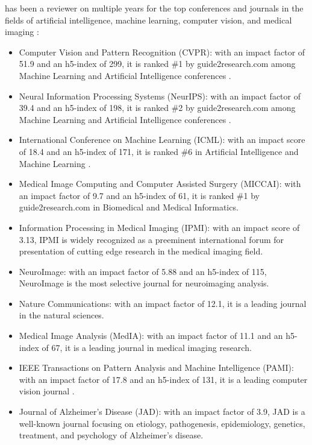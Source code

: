 \documentclass[11pt]{article}
\begin{document}
\dr has been a reviewer on multiple years for the top conferences and journals in the fields of artificial intelligence, machine learning, computer vision, and medical imaging \cite{reviews}:
\begin{itemize}
    \item Computer Vision and Pattern Recognition (CVPR): with an impact factor of 51.9 and an h5-index of 299, it is ranked \#1 by guide2research.com among Machine Learning and Artificial Intelligence conferences  \cite{confrankings}.
    \item Neural Information Processing Systems (NeurIPS): with an impact factor of 39.4 and an h5-index of 198, it is ranked \#2 by guide2research.com among Machine Learning and Artificial Intelligence conferences \cite{confrankings}.
    \item International Conference on Machine Learning (ICML): with an impact score of 18.4 and an h5-index of 171, it is ranked \#6 in Artificial Intelligence and Machine Learning \cite{confrankings}. 
    \item Medical Image Computing and Computer Assisted Surgery (MICCAI): with an impact factor of 9.7 and an h5-index of 61, it is ranked \#1 by guide2research.com in Biomedical and Medical Informatics.
    \item Information Processing in Medical Imaging (IPMI): with an impact score of 3.13, IPMI is widely recognized as a preeminent international forum for presentation of cutting edge research in the medical imaging field. \cite{confrankings}
    \item NeuroImage: with an impact factor of 5.88 and an h5-index of 115, NeuroImage is the most selective journal for neuroimaging analysis. \cite{confrankings}
    \item Nature Communications: with an impact factor of 12.1, it is a leading journal in the natural sciences. \cite{confrankings}
    \item Medical Image Analysis (MedIA): with an impact factor of 11.1 and an h5-index of 67, it is a leading journal in medical imaging research. \cite{confrankings}
    \item IEEE Transactions on Pattern Analysis and Machine Intelligence (PAMI): with an impact factor of 17.8 and an h5-index of 131, it is a leading computer vision journal \cite{confrankings}.
    \item Journal of Alzheimer's Disease (JAD): with an impact factor of 3.9, JAD is a well-known journal focusing on etiology, pathogenesis, epidemiology, genetics, treatment, and psychology of Alzheimer's disease.  
\end{itemize}
\end{document}

